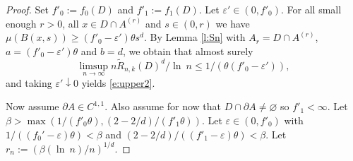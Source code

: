 \documentclass[12pt]{article}
\renewcommand{\emptyset}{\varnothing}
\newcommand{\tR}{{\tilde{R}}}
\newcommand{\eps}{\varepsilon}
\renewcommand{\log}{{\ln \:}}
\begin{document}
	\begin{proof}
		Set $f'_0:= f_0(D)$ and $f'_1:= f_1(D)$.
		Let $\eps' \in (0,f'_0)$. For all small enough $r>0$, all
		$x \in D \cap A^{(r)}$
		and $s \in (0,r)$ we have
		$\mu(B(x,s)) \geq (f'_0- \eps') \theta s^d$. By
		 Lemma \ref{l:Sn} with  $A_r = D \cap A^{(r)}$,
		 $a = (f'_0 - \eps')\theta$ and $b=d$, we obtain that
		 almost surely
		 $$
		 \limsup_{n \to \infty} n \tR_{n,k}(D)^d/\log n 
		 \leq 1/(\theta (f'_0 - \eps')),
		 $$
		 and taking $\eps' \downarrow 0$ yields \eqref{e:upper2}.

		Now assume $\partial A \in C^{1,1}$.
		Also assume for now that $D \cap \partial A \neq \emptyset$
		so $f'_1 < \infty$.
		Let $\beta > \max(1/(f'_0 \theta),
		(2-2/d)/(f'_1 \theta))$.
		Let	$\eps \in (0,f'_0)$
		with $1/((f_0'-  \eps)\theta) < \beta$
		and $(2-2/d) /((f'_1 -  \eps)\theta) < \beta$.
		Let $r_n := (\beta (\log n)/n)^{1/d}$.


\end{proof}
\end{document}
